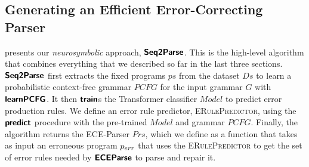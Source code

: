 \subsection{Generating an Efficient Error-Correcting Parser}
\label{sec:whole-system:building-ecp}



 presents our \emph{neurosymbolic} approach, $\bm{\mathsf{Seq2Parse}}$.
This is the high-level algorithm that combines everything that we described so
far in the last three sections. $\bm{\mathsf{Seq2Parse}}$ first extracts the fixed programs
$ps$ from the dataset $Ds$ to learn a probabilistic context-free grammar $PCFG$
for the input grammar $G$ with $\bm{\mathsf{learnPCFG}}$. It then $\bm{\mathsf{train}}$s the
Transformer classifier $Model$ to predict error production rules. We define an
error rule predictor, \textsc{ERulePredictor}, using the $\bm{\mathsf{predict}}$ procedure
with the pre-trained $Model$ and grammar $PCFG$. Finally, the algorithm returns
the ECE-Parser $Prs$, which we define as a function that takes as input an
erroneous program $p_{err}$ that uses the \textsc{ERulePredictor} to get the set
of error rules needed by $\bm{\mathsf{ECEParse}}$ to parse and repair it.
